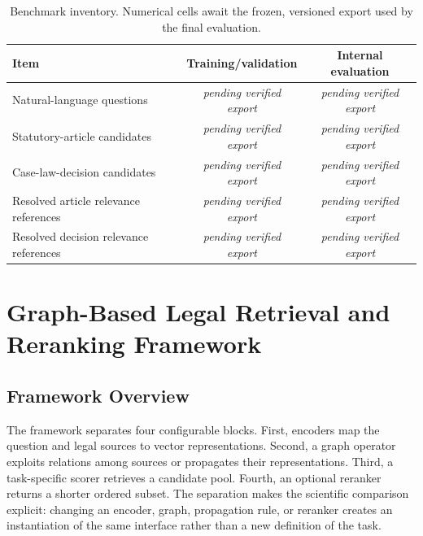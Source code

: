 \documentclass[runningheads]{llncs}
\newcommand{\pending}{\emph{pending verified export}}
\begin{document}
\begin{table}[t]
  \caption{Benchmark inventory. Numerical cells await the frozen, versioned export used by the final evaluation.}
  \label{tab:benchmark}
  \centering
  \small
  \begin{tabularx}{\textwidth}{@{}Xcc@{}}
    \toprule
    Item & Training/validation & Internal evaluation \\
    \midrule
    Natural-language questions & \pending & \pending \\
    Statutory-article candidates & \pending & \pending \\
    Case-law-decision candidates & \pending & \pending \\
    Resolved article relevance references & \pending & \pending \\
    Resolved decision relevance references & \pending & \pending \\
    \bottomrule
  \end{tabularx}
\end{table}

\section{Graph-Based Legal Retrieval and Reranking Framework}

\subsection{Framework Overview}

The framework separates four configurable blocks. First, encoders map the question and legal sources to vector representations. Second, a graph operator exploits relations among sources or propagates their representations. Third, a task-specific scorer retrieves a candidate pool. Fourth, an optional reranker returns a shorter ordered subset. The separation makes the scientific comparison explicit: changing an encoder, graph, propagation rule, or reranker creates an instantiation of the same interface rather than a new definition of the task.
\end{document}
